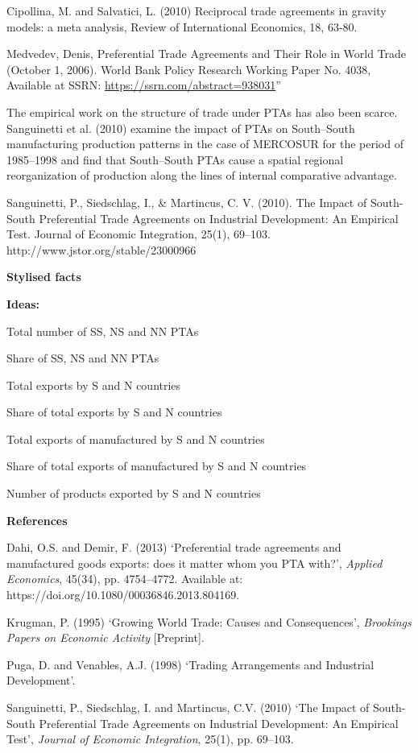 Cipollina, M. and Salvatici, L. (2010) Reciprocal trade agreements in
gravity models: a meta analysis, Review of International Economics, 18,
63-80.

Medvedev, Denis, Preferential Trade Agreements and Their Role in World
Trade (October 1, 2006). World Bank Policy Research Working Paper No.
4038, Available at SSRN: \url{https://ssrn.com/abstract=938031}''

The empirical work on the structure of trade under PTAs has also been
scarce. Sanguinetti et al. (2010) examine the impact of PTAs on
South--South manufacturing production patterns in the case of MERCOSUR
for the period of 1985--1998 and find that South--South PTAs cause a
spatial regional reorganization of production along the lines of
internal comparative advantage.

Sanguinetti, P., Siedschlag, I., \& Martincus, C. V. (2010). The Impact
of South-South Preferential Trade Agreements on Industrial Development:
An Empirical Test. Journal of Economic Integration, 25(1), 69--103.
http://www.jstor.org/stable/23000966

\textbf{Stylised facts}

\textbf{Ideas:}

Total number of SS, NS and NN PTAs

Share of SS, NS and NN PTAs

Total exports by S and N countries

Share of total exports by S and N countries

Total exports of manufactured by S and N countries

Share of total exports of manufactured by S and N countries

Number of products exported by S and N countries

\textbf{References}

Dahi, O.S. and Demir, F. (2013) `Preferential trade agreements and
manufactured goods exports: does it matter whom you PTA with?',
\emph{Applied Economics}, 45(34), pp. 4754--4772. Available at:
https://doi.org/10.1080/00036846.2013.804169.

Krugman, P. (1995) `Growing World Trade: Causes and Consequences',
\emph{Brookings Papers on Economic Activity} {[}Preprint{]}.

Puga, D. and Venables, A.J. (1998) `Trading Arrangements and Industrial
Development'.

Sanguinetti, P., Siedschlag, I. and Martincus, C.V. (2010) `The Impact
of South-South Preferential Trade Agreements on Industrial Development:
An Empirical Test', \emph{Journal of Economic Integration}, 25(1), pp.
69--103.

